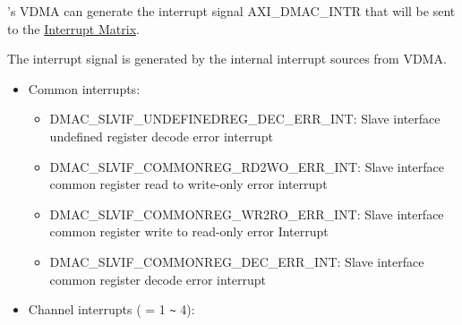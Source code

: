 \documentclass[main\_\_EN.tex]{subfiles}
\begin{document}
\chipname{}'s VDMA can generate the interrupt signal AXI\_DMAC\_INTR that will be sent to the \hyperref[mod:intmtrx]{Interrupt Matrix}.

The interrupt signal is generated by the internal interrupt sources from VDMA.

\begin{itemize}
    \item Common interrupts:
    \begin{itemize}
        \item \label{int:DMACSLVIFUNDEFINEDREGDECERRINT}DMAC\_SLVIF\_UNDEFINEDREG\_DEC\_ERR\_INT: Slave interface undefined register decode error interrupt
        \item \label{int:DMACSLVIFCOMMONREGRD2WOERRINT}DMAC\_SLVIF\_COMMONREG\_RD2WO\_ERR\_INT: Slave interface common register read to write-only error interrupt
        \item \label{int:DMACSLVIFCOMMONREGWR2ROERRINT}DMAC\_SLVIF\_COMMONREG\_WR2RO\_ERR\_INT: Slave interface common register write to read-only error Interrupt
        \item \label{int:DMACSLVIFCOMMONREGDECERRINT}DMAC\_SLVIF\_COMMONREG\_DEC\_ERR\_INT: Slave interface common register decode error interrupt
    \end{itemize}

    \item Channel interrupts ( = 1 \verb+~+ 4):


\end{itemize}
\end{document}
